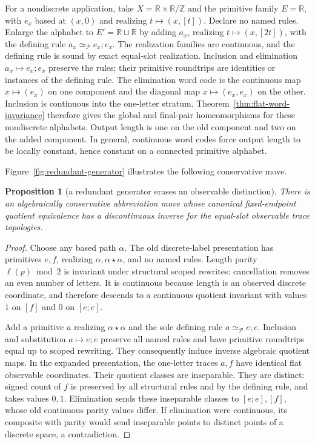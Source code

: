 \documentclass[10pt,reqno]{amsart}
\theoremstyle{definition}
\theoremstyle{plain}
\newtheorem{proposition}[definition]{Proposition}
\theoremstyle{remark}
\newcommand{\RwEq}{\mathrel{\simeq_{\!\mathcal P}}}
\newcommand{\Circle}{\mathbb R/\mathbb Z}
\begin{document}
For a nondiscrete application, take $X=\mathbb R\times\Circle$ and the
primitive family $E=\mathbb R$, with $e_x$ based at $(x,0)$ and realizing
$t\mapsto(x,[t])$. Declare no named rules. Enlarge the alphabet to
$E'=\mathbb R\sqcup\mathbb R$ by adding $a_x$, realizing
$t\mapsto(x,[2t])$, with the defining rule $a_x\RwEq e_x;e_x$.
The realization families are continuous, and the defining rule is sound by
exact equal-slot realization. Inclusion and elimination $a_x\mapsto e_x;e_x$
preserve the rules; their primitive roundtrips are identities or instances
of the defining rule. The elimination word code is the continuous map
$x\mapsto(e_x)$ on one component and the diagonal map $x\mapsto(e_x,e_x)$
on the other. Inclusion is continuous into the one-letter stratum.
Theorem~\ref{thm:flat-word-invariance} therefore gives the global and
final-pair homeomorphisms for these nondiscrete alphabets. Output length is
one on the old component and two on the added component. In general,
continuous word codes force output length to be locally constant, hence
constant on a connected primitive alphabet.

Figure~\ref{fig:redundant-generator} illustrates the following conservative move.

\begin{proposition}[a redundant generator erases an observable distinction]
\label{prop:redundant-generator-observable}
There is an algebraically conservative abbreviation move whose canonical
fixed-endpoint quotient equivalence has a discontinuous inverse for the
equal-slot observable trace topologies.
\end{proposition}
\begin{proof}
Choose any based path $\alpha$. The old discrete-label presentation has
primitives $e,f$, realizing $\alpha,\alpha\star\alpha$, and no named rules.
Length parity $\ell(p)\bmod2$ is invariant under structural scoped rewrites:
cancellation removes an even number of letters. It is continuous because
length is an observed discrete coordinate, and therefore descends to a
continuous quotient invariant with values $1$ on $[f]$ and $0$ on $[e;e]$.

Add a primitive $a$ realizing $\alpha\star\alpha$ and the sole defining
rule $a\RwEq e;e$. Inclusion and substitution $a\mapsto e;e$ preserve all
named rules and have primitive roundtrips equal up to scoped rewriting.
They consequently induce inverse algebraic quotient maps. In the expanded
presentation, the one-letter traces $a,f$ have identical flat observable
coordinates. Their quotient classes are inseparable. They are distinct:
signed count of $f$ is preserved by all structural rules and by the defining
rule, and takes values $0,1$. Elimination sends these inseparable classes to
$[e;e],[f]$, whose old continuous parity values differ. If elimination were
continuous, its composite with parity would send inseparable points to
distinct points of a discrete space, a contradiction.
\end{proof}
\end{document}
